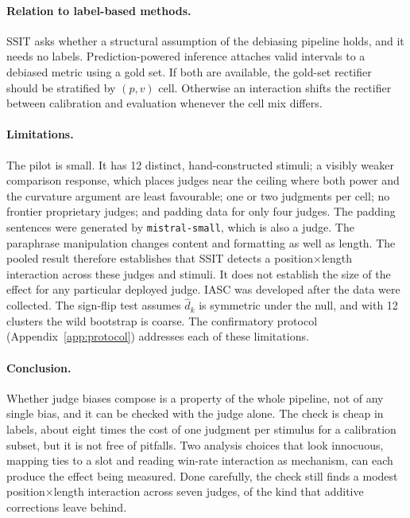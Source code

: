 \documentclass[10pt]{article}
\theoremstyle{remark}
\begin{document}
\paragraph{Relation to label-based methods.}
SSIT asks whether a structural assumption of the debiasing pipeline
holds, and it needs no labels. Prediction-powered inference
\citep{angelopoulos2023ppi,angelopoulos2024ppipp} attaches valid
intervals to a debiased metric using a gold set. If both are available,
the gold-set rectifier should be stratified by $(p,v)$ cell. Otherwise
an interaction shifts the rectifier between calibration and evaluation
whenever the cell mix differs.

\paragraph{Limitations.}
The pilot is small. It has 12 distinct, hand-constructed stimuli; a
visibly weaker comparison response, which places judges near the
ceiling where both power and the curvature argument are least
favourable; one or two judgments per cell; no frontier proprietary
judges; and padding data for only four judges. The padding sentences
were generated by \texttt{mistral-small}, which is also a judge. The
paraphrase manipulation changes content and formatting as well as
length. The pooled result therefore establishes that SSIT detects a
position$\times$length interaction across these judges and stimuli. It
does not establish the size of the effect for any particular deployed
judge. IASC was developed after the data were collected. The
sign-flip test assumes $\hat d_k$ is symmetric under the null, and with
12 clusters the wild bootstrap is coarse. The confirmatory protocol
(Appendix~\ref{app:protocol}) addresses each of these limitations.

\paragraph{Conclusion.}
Whether judge biases compose is a property of the whole pipeline, not
of any single bias, and it can be checked with the judge alone. The
check is cheap in labels, about eight times the cost of one judgment per
stimulus for a calibration subset, but it is not free of pitfalls. Two
analysis choices that look innocuous, mapping ties to a slot and reading
win-rate interaction as mechanism, can each produce the effect being
measured. Done carefully, the check still finds a modest
position$\times$length interaction across seven judges, of the kind
that additive corrections leave behind.
\end{document}
